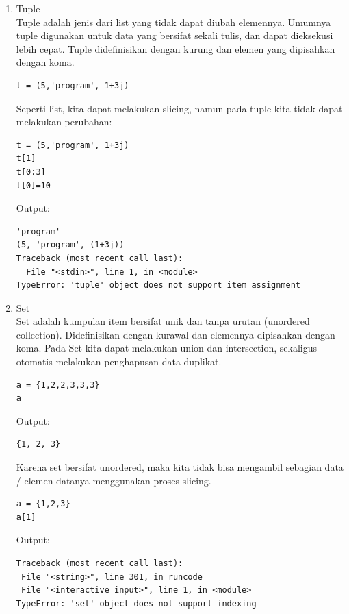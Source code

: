 \begin{enumerate}
\begin{verbatim}
del spam[2]
spam
\end{verbatim}
Output:
\begin{verbatim}
['cat', 'bat']
\end{verbatim}

\item Tuple\\
Tuple adalah jenis dari list yang tidak dapat diubah elemennya. Umumnya tuple digunakan untuk data yang bersifat sekali tulis, dan dapat dieksekusi lebih cepat. Tuple didefinisikan dengan kurung dan elemen yang dipisahkan dengan koma.
\begin{verbatim}
t = (5,'program', 1+3j)
\end{verbatim}
Seperti list, kita dapat melakukan slicing, namun pada tuple kita tidak dapat melakukan perubahan:
\begin{verbatim}
t = (5,'program', 1+3j)
t[1]
t[0:3]
t[0]=10
\end{verbatim}
Output:
\begin{verbatim}
'program'
(5, 'program', (1+3j))
Traceback (most recent call last):
  File "<stdin>", line 1, in <module>
TypeError: 'tuple' object does not support item assignment
\end{verbatim}


\item Set\\
Set adalah kumpulan item bersifat unik dan tanpa urutan (unordered collection). Didefinisikan dengan kurawal dan elemennya dipisahkan dengan koma. Pada Set kita dapat melakukan union dan intersection, sekaligus otomatis melakukan penghapusan data duplikat.

\begin{verbatim}
a = {1,2,2,3,3,3}
a
\end{verbatim}
Output:
\begin{verbatim}
{1, 2, 3}
\end{verbatim}

Karena set bersifat unordered, maka kita tidak bisa mengambil sebagian data / elemen datanya menggunakan proses slicing.
\begin{verbatim}
a = {1,2,3}
a[1]
\end{verbatim}
Output:
\begin{verbatim}
Traceback (most recent call last):
 File "<string>", line 301, in runcode
 File "<interactive input>", line 1, in <module>
TypeError: 'set' object does not support indexing
\end{verbatim}


\end{enumerate}
